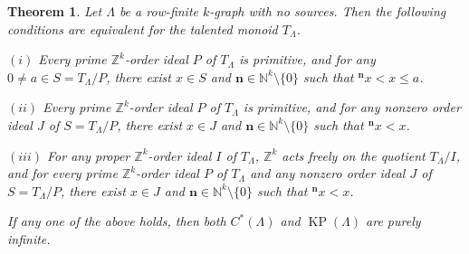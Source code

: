 \documentclass[a4paper,reqno,12pt]{amsart}
\numberwithin{equation}{section}
\newtheorem{thm}{Theorem}[section]
\theoremstyle{definition}
\theoremstyle{remark}
\newcommand{\KP}{\operatorname{KP}}
\newcommand{\N}{\mathbf{n}}
\begin{document}
\begin{thm}\label{th sufficient criterion for purely infinite higher-rank algebras}
Let $\Lambda$ be a row-finite $k$-graph with no sources. Then the following conditions are equivalent for the talented monoid $T_\Lambda$.

$(i)$ Every prime $\mathbb{Z}^k$-order ideal $P$ of $T_\Lambda$ is primitive, and for any $0\neq a\in S=T_\Lambda/{P}$, there exist $x\in S$ and $\N\in \mathbb{N}^k\setminus \{0\}$ such that $^{\N} x< x \leq a$.

$(ii)$ Every prime $\mathbb{Z}^k$-order ideal $P$ of $T_\Lambda$ is primitive, and for any nonzero order ideal $J$ of $S=T_\Lambda/{P}$, there exist $x\in J$ and $\N\in \mathbb{N}^k\setminus \{0\}$ such that $^\N x< x$. 

$(iii)$ For any proper $\mathbb{Z}^k$-order ideal $I$ of $T_\Lambda$, $\mathbb{Z}^k$ acts freely on the quotient $T_\Lambda/{I}$, and for every prime $\mathbb{Z}^k$-order ideal $P$ of $T_\Lambda$ and any nonzero order ideal $J$ of $S=T_\Lambda/{P}$, there exist $x\in J$ and $\N\in \mathbb{N}^k\setminus \{0\}$ such that $^\N x< x$.

If any one of the above holds, then both $C^*(\Lambda)$ and $\KP(\Lambda)$ are purely infinite. 
\end{thm}
\end{document}
